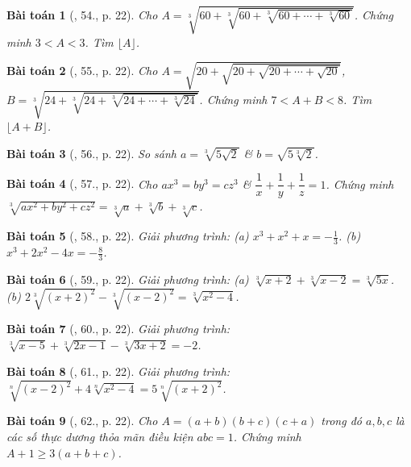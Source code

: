 \documentclass{article}
\newtheorem{baitoan}{Bài toán}
\begin{document}
\begin{baitoan}[\cite{Tuyen_Toan_9}, 54., p. 22]
	Cho $A = \sqrt[3]{60 + \sqrt[3]{60 + \sqrt[3]{60 + \cdots + \sqrt[3]{60}}}}$. Chứng minh $3 < A < 3$. Tìm $\lfloor A\rfloor$.
\end{baitoan}

\begin{baitoan}[\cite{Tuyen_Toan_9}, 55., p. 22]
	Cho $A = \sqrt{20 + \sqrt{20 + \sqrt{20 + \cdots + \sqrt{20}}}}$, $B = \sqrt[3]{24 + \sqrt[3]{24 + \sqrt[3]{24 + \cdots + \sqrt[3]{24}}}}$. Chứng minh $7 < A + B < 8$. Tìm $\lfloor A + B\rfloor$.
\end{baitoan}

\begin{baitoan}[\cite{Tuyen_Toan_9}, 56., p. 22]
	So sánh $a = \sqrt[3]{5\sqrt{2}}$ \& $b = \sqrt{5\sqrt[3]{2}}$.
\end{baitoan}

\begin{baitoan}[\cite{Tuyen_Toan_9}, 57., p. 22]
	Cho $ax^3 = by^3 = cz^3$ \& $\dfrac{1}{x} + \dfrac{1}{y} + \dfrac{1}{z} = 1$. Chứng minh $\sqrt[3]{ax^2 + by^2 + cz^2} = \sqrt[3]{a} + \sqrt[3]{b} + \sqrt[3]{c}$.	
\end{baitoan}

\begin{baitoan}[\cite{Tuyen_Toan_9}, 58., p. 22]
	Giải phương trình: (a) $x^3 + x^2 + x = -\frac{1}{3}$. (b) $x^3 + 2x^2 - 4x = -\frac{8}{3}$.
\end{baitoan}

\begin{baitoan}[\cite{Tuyen_Toan_9}, 59., p. 22]
	Giải phương trình: (a) $\sqrt[3]{x + 2} + \sqrt[3]{x - 2} = \sqrt[3]{5x}$. (b) $2\sqrt[3]{(x + 2)^2} - \sqrt[3]{(x - 2)^2} = \sqrt[3]{x^2 - 4}$.
\end{baitoan}

\begin{baitoan}[\cite{Tuyen_Toan_9}, 60., p. 22]
	Giải phương trình: $\sqrt[3]{x - 5} + \sqrt[3]{2x - 1} - \sqrt[3]{3x + 2} = -2$.
\end{baitoan}

\begin{baitoan}[\cite{Tuyen_Toan_9}, 61., p. 22]
	Giải phương trình: $\sqrt[n]{(x - 2)^2} + 4\sqrt[n]{x^2 - 4} = 5\sqrt[n]{(x + 2)^2}$.
\end{baitoan}

\begin{baitoan}[\cite{Tuyen_Toan_9}, 62., p. 22]
	Cho $A = (a + b)(b + c)(c + a)$ trong đó $a,b,c$ là các số thực dương thỏa mãn điều kiện $abc = 1$. Chứng minh $A + 1\ge3(a + b + c)$.
\end{baitoan}
\end{document}
